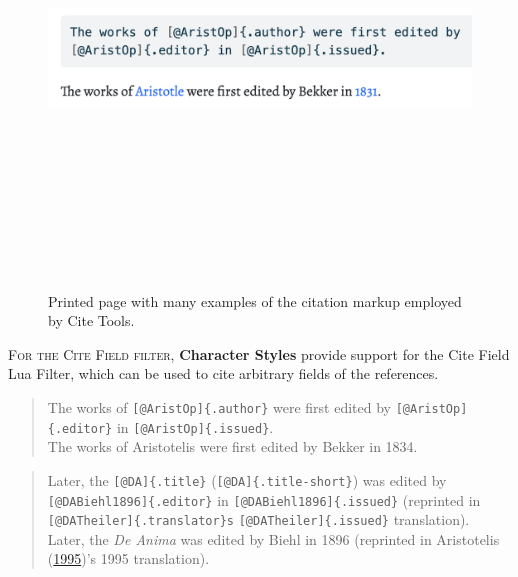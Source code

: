 \documentclass[
  12pt,
  a4paper,
  oneside,
  titlepage,
  toclink=all,
  toc=bibliography]{scrbook}
\theoremstyle{definition}
\theoremstyle{plain}
\theoremstyle{plain}
\theoremstyle{plain}
\theoremstyle{plain}
\theoremstyle{definition}
\theoremstyle{definition}
\theoremstyle{plain}
\theoremstyle{remark}
\begin{document}
\begin{figure}

{\centering \includegraphics[width=4.63542in,height=4.77083in]{citefield.png}

}

\caption{\label{fig-scriv44}Printed page with many examples of the
citation markup employed by Cite Tools.}

\end{figure}

\textsc{For the Cite Field filter,} \textbf{Character Styles} provide
support for the Cite Field Lua Filter, which can be used to cite
arbitrary fields of the references.

\begin{quote}
The works of \texttt{{[}@AristOp{]}\{.author\}} were first edited by
\texttt{{[}@AristOp{]}\{.editor\}} in
\texttt{{[}@AristOp{]}\{.issued\}}.\\
The works of Aristotelis were first edited by Bekker in 1834.
\end{quote}

\begin{quote}
Later, the \texttt{{[}@DA{]}\{.title\}}
(\texttt{{[}@DA{]}\{.title-short\}}) was edited by
\texttt{{[}@DABiehl1896{]}\{.editor\}} in
\texttt{{[}@DABiehl1896{]}\{.issued\}} (reprinted in
\texttt{{[}@DATheiler{]}\{.translator\}\textquotesingle{}s}
\texttt{{[}@DATheiler{]}\{.issued\}} translation).\\
Later, the \emph{De Anima} was edited by Biehl in 1896 (reprinted in
{\protect\hypertarget{cite_93}{}{\label{cite_93}Aristotelis
(\protect\hyperlink{ref-DATheiler}{1995})}}'s 1995 translation).
\end{quote}
\end{document}

